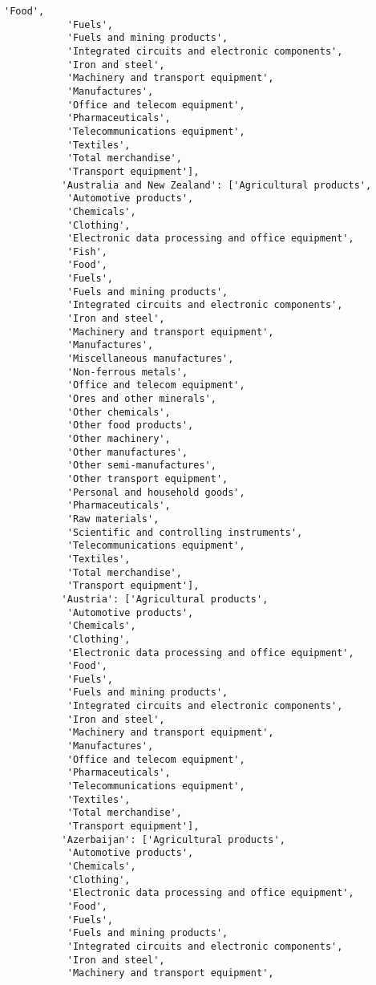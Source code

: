 \documentclass[11pt]{article}
\begin{document}
\begin{Verbatim}[commandchars=\\\{\}]
           'Food',
           'Fuels',
           'Fuels and mining products',
           'Integrated circuits and electronic components',
           'Iron and steel',
           'Machinery and transport equipment',
           'Manufactures',
           'Office and telecom equipment',
           'Pharmaceuticals',
           'Telecommunications equipment',
           'Textiles',
           'Total merchandise',
           'Transport equipment'],
          'Australia and New Zealand': ['Agricultural products',
           'Automotive products',
           'Chemicals',
           'Clothing',
           'Electronic data processing and office equipment',
           'Fish',
           'Food',
           'Fuels',
           'Fuels and mining products',
           'Integrated circuits and electronic components',
           'Iron and steel',
           'Machinery and transport equipment',
           'Manufactures',
           'Miscellaneous manufactures',
           'Non-ferrous metals',
           'Office and telecom equipment',
           'Ores and other minerals',
           'Other chemicals',
           'Other food products',
           'Other machinery',
           'Other manufactures',
           'Other semi-manufactures',
           'Other transport equipment',
           'Personal and household goods',
           'Pharmaceuticals',
           'Raw materials',
           'Scientific and controlling instruments',
           'Telecommunications equipment',
           'Textiles',
           'Total merchandise',
           'Transport equipment'],
          'Austria': ['Agricultural products',
           'Automotive products',
           'Chemicals',
           'Clothing',
           'Electronic data processing and office equipment',
           'Food',
           'Fuels',
           'Fuels and mining products',
           'Integrated circuits and electronic components',
           'Iron and steel',
           'Machinery and transport equipment',
           'Manufactures',
           'Office and telecom equipment',
           'Pharmaceuticals',
           'Telecommunications equipment',
           'Textiles',
           'Total merchandise',
           'Transport equipment'],
          'Azerbaijan': ['Agricultural products',
           'Automotive products',
           'Chemicals',
           'Clothing',
           'Electronic data processing and office equipment',
           'Food',
           'Fuels',
           'Fuels and mining products',
           'Integrated circuits and electronic components',
           'Iron and steel',
           'Machinery and transport equipment',

\end{Verbatim}
\end{document}
